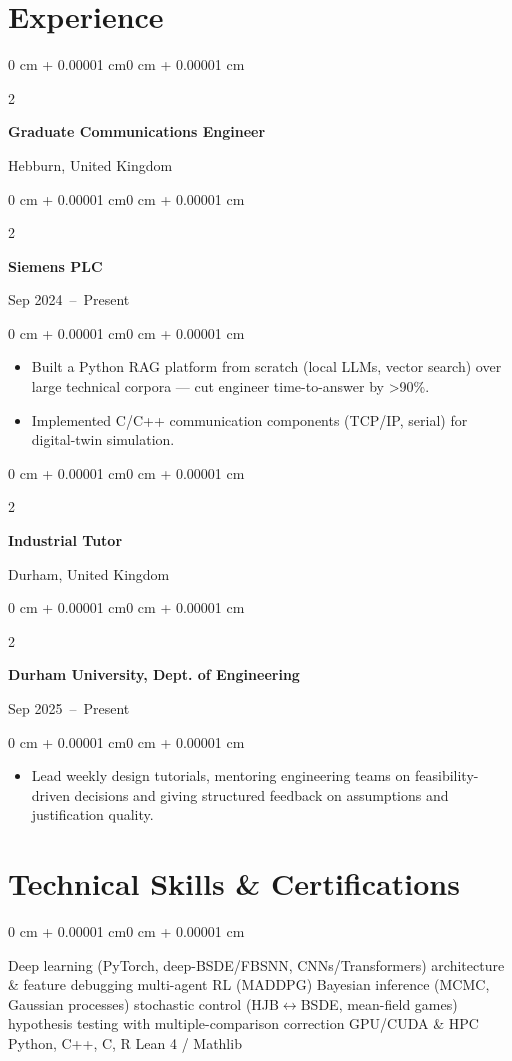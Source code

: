 \documentclass[10pt, letterpaper]{article}
\newenvironment{highlights}{
    \begin{itemize}[
        topsep=0.10 cm,
        parsep=0.10 cm,
        partopsep=0pt,
        itemsep=0pt,
        leftmargin=0 cm + 10pt
    ]
}{
    \end{itemize}
}
\newenvironment{onecolentry}{
    \begin{adjustwidth}{0 cm + 0.00001 cm}{0 cm + 0.00001 cm}
}{
    \end{adjustwidth}
}
\newenvironment{twocolentry}[2][]{
    \onecolentry{}
    \def\secondColumn{#2}
    \setcolumnwidth{\fill, 4.5 cm}
    \begin{paracol}{2}
}{
    \switchcolumn{} \raggedleft{} \secondColumn{}
    \end{paracol}
    \endonecolentry{}
}
\begin{document}
\section*{Experience}

\begin{twocolentry}
  {Hebburn, United Kingdom}
  \textbf{Graduate Communications Engineer}
\end{twocolentry}
\begin{twocolentry}
  {Sep 2024~--~Present}
  \textbf{Siemens PLC}
\end{twocolentry}
\vspace{0.10 cm}
\begin{onecolentry}
  \begin{highlights}
    \item Built a Python RAG platform from scratch (local LLMs, vector search) over large technical corpora --- cut engineer time-to-answer by >90\%.
    \item Implemented C/C++ communication components (TCP/IP, serial) for digital-twin simulation.
  \end{highlights}
\end{onecolentry}

\vspace{0.08 cm}

\begin{twocolentry}
  {Durham, United Kingdom}
  \textbf{Industrial Tutor}
\end{twocolentry}
\begin{twocolentry}
  {Sep 2025~--~Present}
  \textbf{Durham University, Dept. of Engineering}
\end{twocolentry}
\vspace{0.10 cm}
\begin{onecolentry}
  \begin{highlights}
    \item Lead weekly design tutorials, mentoring engineering teams on feasibility-driven decisions and giving structured feedback on assumptions and justification quality.
  \end{highlights}
\end{onecolentry}

\section*{Technical Skills \& Certifications}

\begin{onecolentry}
  \begin{highlights}
    Deep learning (PyTorch, deep-BSDE/FBSNN, CNNs/Transformers) \textbullet{} architecture \& feature debugging \textbullet{} multi-agent RL (MADDPG) \textbullet{} Bayesian inference (MCMC, Gaussian processes) \textbullet{} stochastic control (HJB$\leftrightarrow$BSDE, mean-field games) \textbullet{} hypothesis testing with multiple-comparison correction \textbullet{} GPU/CUDA \& HPC \textbullet{} Python, C++, C, R \textbullet{} Lean 4 / Mathlib
  \end{highlights}
\end{onecolentry}
\end{document}
